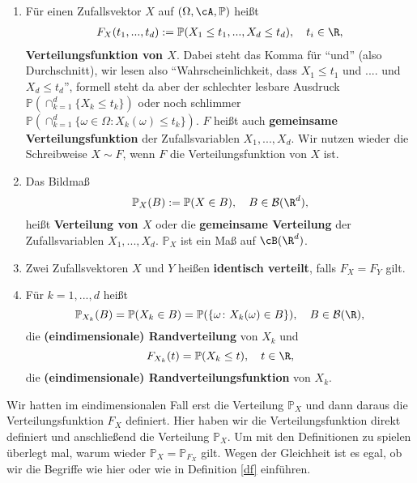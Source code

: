 \begin{deff}
	\begin{enumerate}[label=(\roman*)]
		\item Für einen Zufallsvektor $X$ auf $(\Omega, \cA, \mathbb{P})$ heißt
		\begin{align*}
			F_X(t_1,...,t_d) := \mathbb{P}(X_1 \leq t_1,...,X_d \leq t_d), \quad t_i\in\R,
		\end{align*}	
		 \textbf{Verteilungsfunktion von $X$}. Dabei steht das Komma f\"ur \enquote{und} (also Durchschnitt), wir lesen also \enquote{Wahrscheinlichkeit, dass $X_1\leq t_1$ und .... und $X_d\leq t_d$}, formell steht da aber der schlechter lesbare Ausdruck $\mathbb P(\cap_{k=1}^d \{X_k\leq t_k\})$ oder noch schlimmer $\mathbb P(\cap_{k=1}^d \{\omega\in \Omega: X_k(\omega)\leq t_k\})$. $F$ heißt auch \textbf{gemeinsame Verteilungsfunktion} der Zufallsvariablen $X_1,...,X_d$. Wir nutzen wieder die Schreibweise $X\sim F$, wenn $F$ die Verteilungsfunktion von $X$ ist.
		\item Das Bildma\ss{} $$\mathbb{P}_X(B) := \mathbb{P}(X \in B),\quad B\in \mathcal B(\R^d),$$ heißt \textbf{Verteilung von $X$} oder die  \textbf{gemeinsame Verteilung} der Zufallsvariablen $X_1,...,X_d$. $\mathbb{P}_X$ ist ein Maß auf $\cB(\R^d)$.
 		\item Zwei Zufallsvektoren $X$ und $Y$ heißen \textbf{identisch verteilt}, falls $F_X = F_Y$ gilt.
		\item F\"ur $k=1,...,d$ hei\ss t $$\mathbb{P}_{X_k}(B) = \mathbb{P}(X_k \in B) = \mathbb{P}(\{ \omega \colon X_k(\omega) \in B \}), \quad B\in \mathcal B(\R),$$ die \textbf{(eindimensionale) Randverteilung} von $X_k$ und 	
		  \[ F_{X_k}(t) = \mathbb P(X_k\leq t),\quad t\in\R,  \]
		die \textbf{(eindimensionale) Randverteilungsfunktion} von $X_k$.
	\end{enumerate}
\end{deff}
Wir hatten im eindimensionalen Fall erst die Verteilung $\mathbb P_X$ und dann daraus die Verteilungsfunktion $F_X$ definiert. Hier haben wir die Verteilungsfunktion direkt definiert und anschlie\ss end die Verteilung $\mathbb P_X$. Um mit den Definitionen zu spielen \"uberlegt mal, warum wieder $\mathbb{P}_X = \mathbb{P}_{F_X}$ gilt. Wegen der Gleichheit ist es egal, ob wir die Begriffe wie hier oder wie in Definition \ref{df} einf\"uhren.\smallskip



